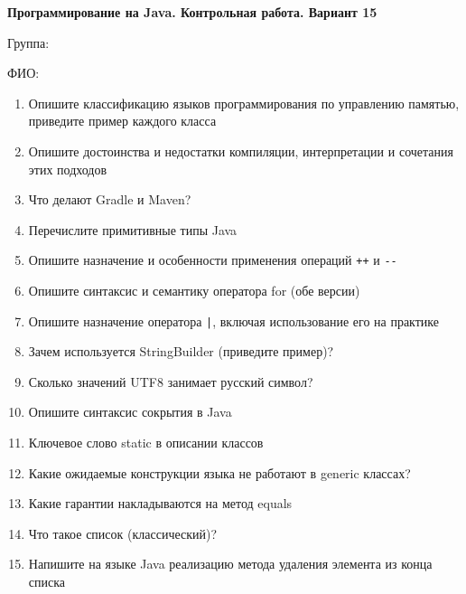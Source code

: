 \documentclass[12pt]{article}
\begin{document}
\newpage\begin{minipage}{\textwidth}
\textbf{Программирование на Java. Контрольная работа. Вариант 15}

Группа: \underline{\hspace{3cm}}

ФИО: \underline{\hspace{10cm}}

\begin{enumerate}
\item Опишите классификацию языков программирования по управлению памятью, приведите пример каждого класса
\item Опишите достоинства и недостатки компиляции, интерпретации и сочетания этих подходов
\item Что делают Gradle и Maven?
\item Перечислите примитивные типы Java
\item Опишите назначение и особенности применения операций \verb|++| и \verb|--|
\item Опишите синтаксис и семантику оператора for (обе версии)
\item Опишите назначение оператора \verb!|!, включая использование его на практике
\item Зачем используется StringBuilder (приведите пример)?
\item Сколько значений UTF8 занимает русский символ?
\item Опишите синтаксис сокрытия в Java
\item Ключевое слово static в описании классов
\item Какие ожидаемые конструкции языка не работают в generic классах?
\item Какие гарантии накладываются на метод equals
\item Что такое список (классический)?
\item Напишите на языке Java реализацию метода удаления элемента из конца списка

\end{enumerate}
\end{minipage}
\end{document}
